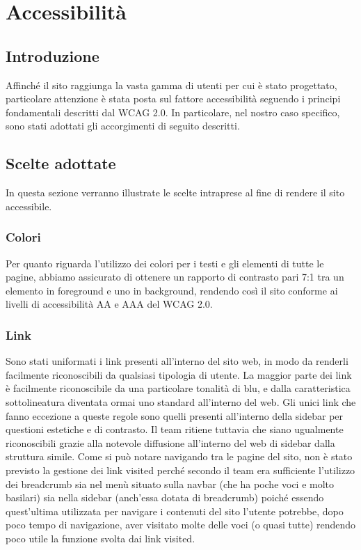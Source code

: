\documentclass[12pt]{article}
\begin{document}
	\section{Accessibilità}
	\subsection{Introduzione}
	Affinché il sito raggiunga la vasta gamma di utenti per cui è stato progettato, particolare attenzione è stata posta sul fattore accessibilità seguendo i principi fondamentali descritti dal WCAG 2.0. In particolare, nel nostro caso specifico, sono stati adottati gli accorgimenti di seguito descritti.
	\subsection{Scelte adottate}
	In questa sezione verranno illustrate le scelte intraprese al fine di rendere il sito accessibile.
	\subsubsection{Colori}
	Per quanto riguarda l'utilizzo dei colori per i testi e gli elementi di tutte le pagine, abbiamo assicurato di ottenere un rapporto di contrasto pari 7:1 tra un elemento in foreground e uno in background, rendendo così il sito conforme ai livelli di accessibilità AA e AAA del WCAG 2.0. 
	\subsubsection{Link}
	Sono stati uniformati i link presenti all'interno del sito web, in modo da renderli facilmente riconoscibili da qualsiasi tipologia di utente. La maggior parte dei link è facilmente riconoscibile da una particolare tonalità di blu, e dalla caratteristica sottolineatura diventata ormai uno standard all'interno del web. Gli unici link che fanno eccezione a queste regole sono quelli presenti all'interno della sidebar per questioni estetiche e di contrasto. Il team ritiene tuttavia che siano ugualmente riconoscibili grazie alla notevole diffusione all'interno del web di sidebar dalla struttura simile.
	Come si può notare navigando tra le pagine del sito, non è stato previsto la gestione dei link visited perché secondo il team era sufficiente l'utilizzo dei breadcrumb sia nel menù situato sulla navbar (che ha poche voci e molto basilari) sia nella sidebar (anch'essa dotata di breadcrumb) poiché essendo quest'ultima utilizzata per navigare i contenuti del sito l'utente potrebbe, dopo poco tempo di navigazione, aver visitato molte delle voci (o quasi tutte) rendendo poco utile la funzione svolta dai link visited.
\end{document}

